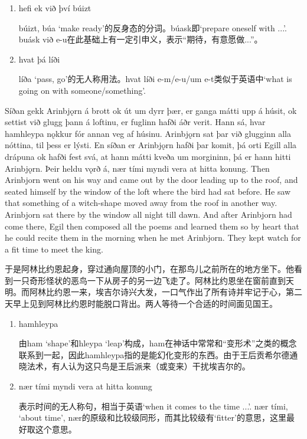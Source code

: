 \begin{grammar*}{}
  \begin{enumerate}[leftmargin=*]
    \item hefi ek við því búizt

          búizt, búa `make ready'的反身态的分词。búask即`prepare oneself with ...'. buásk við e-u在此基础上有一定引申义，表示“期待，有意愿做...”。

    \item hvat þá líði

          líða `pass, go'的无人称用法。hvat líði e-m/e-u/um e-t类似于英语中`what is going on with someone/something'.

  \end{enumerate}
\end{grammar*}
\begin{paracol}{2}
  Síðan gekk Arinbjǫrn á brott ok út um dyrr þær, er ganga mátti upp á húsit, ok settist við glugg þann á loftinu, er fuglinn hafði áðr verit. Hann sá, hvar hamhleypa nǫkkur fór annan veg af húsinu. Arinbjǫrn sat þar við glugginn alla nóttina, til þess er lýsti. En síðan er Arinbjǫrn hafði þar komit, þá orti Egill alla drápuna ok hafði fest svá, at hann mátti kveða um morgininn, þá er hann hitti Arinbjǫrn. Þeir heldu vǫrð á, nær tími myndi vera at hitta konung.
  \switchcolumn
  Then Arinbjorn went on his way and came out by the door leading up to the roof, and seated himself by the window of the loft where the bird had sat before. He saw that something of a witch-shape moved away from the roof in another way. Arinbjorn sat there by the window all night till dawn. And after Arinbjorn had come there, Egil then composed all the poems and learned them so by heart that he could recite them in the morning when he met Arinbjorn. They kept watch for a fit time to meet the king.
\end{paracol}

\begin{translation*}{}
  于是阿林比约恩起身，穿过通向屋顶的小门，在那鸟儿之前所在的地方坐下。他看到一只奇形怪状的恶鸟一下从房子的另一边飞走了。阿林比约恩坐在窗前直到天明。而阿林比约恩一来，埃吉尔诗兴大发，一口气作出了所有诗并牢记于心，第二天早上见到阿林比约恩时能脱口背出。两人等待一个合适的时间面见国王。
\end{translation*}
\begin{grammar*}{}
  \begin{enumerate}[leftmargin=*]
    \item hamhleypa

          由ham `shape'和hleypa `leap'构成，ham在神话中常常和“变形术”之类的概念联系到一起，因此hamhleypa指的是能幻化变形的东西。由于王后贡希尔德通晓法术，有人认为这只鸟是王后派来（或变来）干扰埃吉尔的。

    \item nær tími myndi vera at hitta konung

          表示时间的无人称句，相当于英语`when it comes to the time ...'. nær tími, `about time', nær的原级和比较级同形，而其比较级有`fitter'的意思，这里最好取这个意思。
  \end{enumerate}
\end{grammar*}

